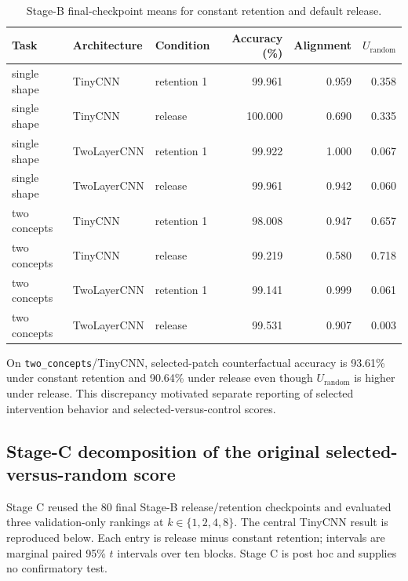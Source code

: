 \begin{table}[h]
\caption{Stage-B final-checkpoint means for constant retention and default release.}
\label{tab:stage-b-endpoints}
\centering
\footnotesize
\setlength{\tabcolsep}{3pt}
\begin{tabular}{lllrrr}
\toprule
Task & Architecture & Condition & Accuracy (\%) & Alignment & $U_{\mathrm{random}}$ \\
\midrule
single shape & TinyCNN & retention 1 & 99.961 & 0.959 & 0.358 \\
single shape & TinyCNN & release & 100.000 & 0.690 & 0.335 \\
\addlinespace[2pt]
single shape & TwoLayerCNN & retention 1 & 99.922 & 1.000 & 0.067 \\
single shape & TwoLayerCNN & release & 99.961 & 0.942 & 0.060 \\
\addlinespace[2pt]
two concepts & TinyCNN & retention 1 & 98.008 & 0.947 & 0.657 \\
two concepts & TinyCNN & release & 99.219 & 0.580 & 0.718 \\
\addlinespace[2pt]
two concepts & TwoLayerCNN & retention 1 & 99.141 & 0.999 & 0.061 \\
two concepts & TwoLayerCNN & release & 99.531 & 0.907 & 0.003 \\
\bottomrule
\end{tabular}
\end{table}

On \texttt{two\_concepts}/TinyCNN, selected-patch counterfactual accuracy is 93.61\% under constant retention and 90.64\% under release even though $U_{\mathrm{random}}$ is higher under release. This discrepancy motivated separate reporting of selected intervention behavior and selected-versus-control scores.

\subsection{Stage-C decomposition of the original selected-versus-random score}\label{app:stage-c-decomposition}

Stage C reused the 80 final Stage-B release/retention checkpoints and evaluated three validation-only rankings at $k\in\{1,2,4,8\}$. The central TinyCNN result is reproduced below. Each entry is release minus constant retention; intervals are marginal paired 95\% $t$ intervals over ten blocks. Stage C is post hoc and supplies no confirmatory test.

